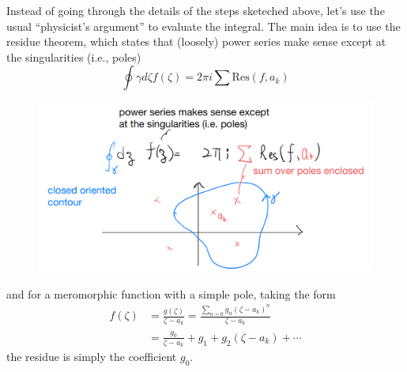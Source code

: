 Instead of going through the details of the steps sketeched above, let's use the usual ``physicist's argument'' to evaluate the integral. The main idea is to use the residue theorem, which states that (loosely) power series make sense except at the singularities (i.e., poles)
\[ \oint{\gamma}{d\zeta f\left( \zeta \right)}=2\pi i\sum{\mathrm{Res}\left( f,a_k \right)}\]
\begin{figure}[ht]
    \centering
    \includegraphics[width=\textwidth]{jupyterbook/data/fig/lec12-fig02.png}
\end{figure}
and for a meromorphic function with a simple pole, taking the form
\begin{align*}
    f\left( \zeta \right) &=\frac{g\left( \zeta \right)}{\zeta -a_k}=\frac{\sum_{n=0}{g_n\left( \zeta -a_k \right) ^n}}{\zeta -a_k}\\
    &=\frac{g_0}{\zeta -a_k}+g_1+g_2\left( \zeta -a_k \right) +\cdots
\end{align*}
the residue is simply the coefficient $g_0$.

